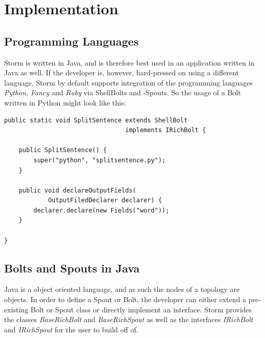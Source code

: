 \documentclass[12pt,a4paper]{article}
\begin{document}
\section{Implementation}
\subsection{Programming Languages}
Storm is written in Java, and is therefore best used in an application written in Java as well. If the developer is, however, hard-pressed on using a different language, Storm by default supports integration of the programming languages \textit{Python}, \textit{Fancy} and \textit{Ruby} via ShellBolts and -Spouts. So the usage of a Bolt written in Python might look like this:\\
\begin{lstlisting}
public static void SplitSentence extends ShellBolt
                                 implements IRichBolt {
                                 
    public SplitSentence() {
        super("python", "splitsentence.py");
    }
    
    public void declareOutputFields(
            OutputFiledDeclarer declarer) {
        declarer.declare(new Fields("word"));
    }
    
}
\end{lstlisting}
\subsection{Bolts and Spouts in Java}
\label{sec:ImplementNodes}
Java is a object oriented language, and as such the nodes of a topology are objects. In order to define a Spout or Bolt, the developer can either extend a pre-existing Bolt or Spout class or directly implement an interface. Storm provides the classes \textit{BaseRichBolt} and \textit{BaseRichSpout} as well as the interfaces \textit{IRichBolt} and \textit{IRichSpout} for the user to build off of.\\
\end{document}
